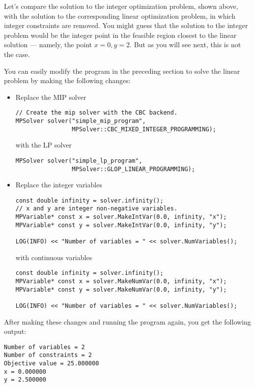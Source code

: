 \documentclass[a4paper,12pt,notitlepage,twoside,openright]{article}
\begin{document}
Let's compare the solution to the integer optimization problem, shown above, with the solution to the corresponding linear optimization problem, in which integer constraints are removed. You might guess that the solution to the integer problem would be the integer point in the feasible region closest to the linear solution --- namely, the point \(x = 0,  y = 2\). But as you will see next, this is not the case.

You can easily modify the program in the preceding section to solve the linear problem by making the following changes:

\begin{itemize}
\item Replace the MIP solver
\begin{verbatim}
// Create the mip solver with the CBC backend.
MPSolver solver("simple_mip_program",
                MPSolver::CBC_MIXED_INTEGER_PROGRAMMING);
\end{verbatim}
with the LP solver
\begin{verbatim}
MPSolver solver("simple_lp_program",
                MPSolver::GLOP_LINEAR_PROGRAMMING);
\end{verbatim}
\item Replace the integer variables
\begin{verbatim}
const double infinity = solver.infinity();
// x and y are integer non-negative variables.
MPVariable* const x = solver.MakeIntVar(0.0, infinity, "x");
MPVariable* const y = solver.MakeIntVar(0.0, infinity, "y");

LOG(INFO) << "Number of variables = " << solver.NumVariables();
\end{verbatim}
with continuous variables
\begin{verbatim}
const double infinity = solver.infinity();
MPVariable* const x = solver.MakeNumVar(0.0, infinity, "x");
MPVariable* const y = solver.MakeNumVar(0.0, infinity, "y");

LOG(INFO) << "Number of variables = " << solver.NumVariables();
\end{verbatim}
\end{itemize}

After making these changes and running the program again, you get the following output:

\begin{verbatim}
Number of variables = 2
Number of constraints = 2
Objective value = 25.000000
x = 0.000000
y = 2.500000
\end{verbatim}
\end{document}
